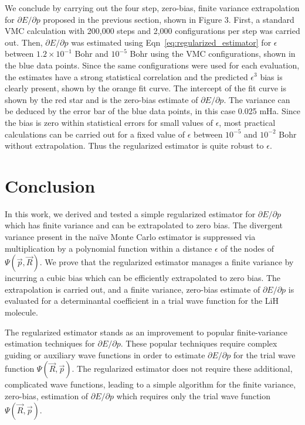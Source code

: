 \documentclass[twocolumn]{revtex4-1}
\begin{document}
We conclude by carrying out the four step, zero-bias, finite variance extrapolation for $\partial E/\partial p$ proposed in the previous section, shown in Figure 3.
First, a standard VMC calculation with 200,000 steps and 2,000 configurations per step was carried out.
Then, $\partial E/\partial p$ was estimated using Eqn~\ref{eq:regularized_estimator} for $\epsilon$ between $1.2 \times 10^{-1}$ Bohr and $10^{-5}$ Bohr using the VMC configurations, shown in the blue data points.
Since the same configurations were used for each evaluation, the estimates have a strong statistical correlation and the predicted $\epsilon^3$ bias is clearly present, shown by the orange fit curve.
The intercept of the fit curve is shown by the red star and is the zero-bias estimate of $\partial E/\partial p$.
The variance can be deduced by the error bar of the blue data points, in this case 0.025 mHa.
Since the bias is zero within statistical errors for small values of $\epsilon$, most practical calculations can be carried out for a fixed value of $\epsilon$ between $10^{-5}$ and $10^{-2}$ Bohr without extrapolation.
Thus the regularized estimator is quite robust to $\epsilon$.

\section{Conclusion}
In this work, we derived and tested a simple regularized estimator for $\partial E/\partial p$ which has finite variance and can be extrapolated to zero bias.
The divergent variance present in the na\"ive Monte Carlo estimator is suppressed via multiplication by a polynomial function within a distance $\epsilon$ of the nodes of $\Psi(\vec{p}, \vec{R})$. 
We prove that the regularized estimator manages a finite variance by incurring a cubic bias which can be efficiently extrapolated to zero bias.
The extrapolation is carried out, and a finite variance, zero-bias estimate of $\partial E/\partial p$ is evaluated for a determinantal coefficient in a trial wave function for the LiH molecule.

The regularized estimator stands as an improvement to popular finite-variance estimation techniques for $\partial E/\partial p$.
These popular techniques require complex guiding \cite{Avella, Attaccalite2008, Zen2013}  or auxiliary wave functions \cite{Assaraf1999, doi:10.1063/1.1286598, Assaraf2003} in order to estimate $\partial E/\partial p$ for the trial wave function $\Psi(\vec{R}, \vec{p})$.
The regularized estimator does not require these additional, complicated wave functions, leading  to a simple algorithm for the finite variance, zero-bias, estimation of $\partial E/\partial p$ which requires only the trial wave function $\Psi(\vec{R}, \vec{p})$.
\end{document}
